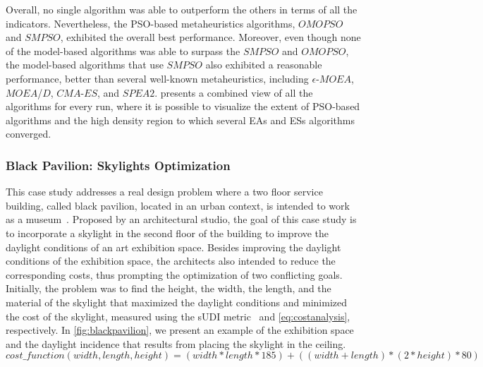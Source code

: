 Overall, no single algorithm was able to outperform the others in terms of all the indicators. Nevertheless, the \ac{PSO}-based metaheuristics algorithms, $OMOPSO$ and $SMPSO$, exhibited the overall best performance. Moreover, even though none of the model-based algorithms was able to surpass the $SMPSO$ and $OMOPSO$, the model-based algorithms that use $SMPSO$ also exhibited a reasonable performance, better than several well-known metaheuristics, including $\epsilon$-$MOEA$, $MOEA$/$D$, $CMA$-$ES$, and $SPEA2$.  presents a combined view of all the algorithms for every run, where it is possible to visualize the extent of \ac{PSO}-based algorithms and the high density region to which several \acp{EA} and \acp{ES} algorithms converged.

\subsubsection{Black Pavilion: Skylights Optimization}
This case study addresses a real design problem where a two floor service building, called black pavilion, located in an urban context, is intended to work as a museum~\cite{Caetano2018,IP2019MOO}. Proposed by an architectural studio, the goal of this case study is to incorporate a skylight in the second floor of the building to improve the daylight conditions of an art exhibition space. Besides improving the daylight conditions of the exhibition space, the architects also intended to reduce the corresponding costs, thus prompting the optimization of two conflicting goals. Initially, the problem was to find the height, the width, the length, and the material of the skylight that maximized the daylight conditions and minimized the cost of the skylight, measured using the \ac{sUDI} metric~\cite{Nabil2006} and \cref{eq:costanalysis}, respectively. In \cref{fig:blackpavilion}, we present an example of the exhibition space and the daylight incidence that results from placing the skylight in the ceiling.
\begin{equation} \label{eq:costanalysis}
cost\_function(width, length, height) = (width * length * 185) + ((width + length) * ( 2 * height) * 80)
\end{equation}

